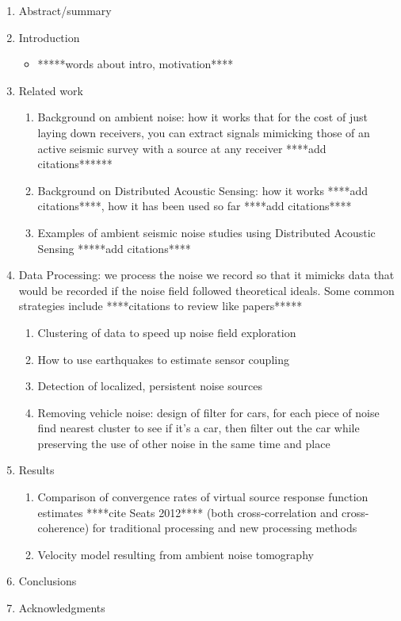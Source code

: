 \documentclass[11pt]{amsart}
\begin{document}
	\begin{enumerate}
	\item Abstract/summary
	\item Introduction 
		\begin{itemize}
		\item *****words about intro, motivation****
		\end{itemize}
	\item Related work
		\begin{enumerate}
		\item Background on ambient noise: how it works that for the cost of just laying down receivers, you can extract signals mimicking those of an active seismic survey with a source at any receiver ****add citations******
		\item Background on Distributed Acoustic Sensing: how it works ****add citations****, how it has been used so far ****add citations****
		\item Examples of ambient seismic noise studies using Distributed Acoustic Sensing *****add citations****
		\end{enumerate}
	\item Data Processing: we process the noise we record so that it mimicks data that would be recorded if the noise field followed theoretical ideals. Some common strategies include ****citations to review like papers*****
		\begin{enumerate}
		\item Clustering of data to speed up noise field exploration
		\item How to use earthquakes to estimate sensor coupling 
		\item Detection of localized, persistent noise sources 
		\item Removing vehicle noise: design of filter for cars, for each piece of noise find nearest cluster to see if it's a car, then filter out the car while preserving the use of other noise in the same time and place
		\end{enumerate}
	\item Results
		\begin{enumerate}
		\item Comparison of convergence rates of virtual source response function estimates ****cite Seats 2012**** (both cross-correlation and cross-coherence) for traditional processing and new processing methods
		\item Velocity model resulting from ambient noise tomography
		\end{enumerate}
	\item Conclusions
	\item Acknowledgments
	\end{enumerate}
\end{document}
